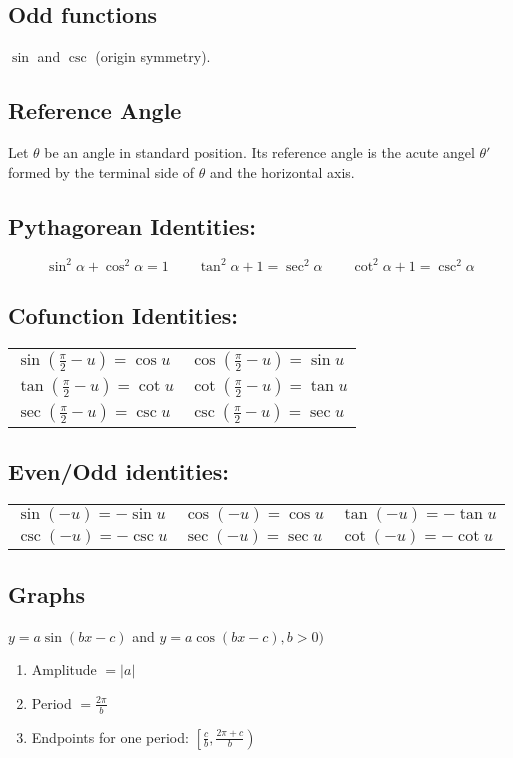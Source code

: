 \documentclass{amsart}
\begin{document}
\begin{multicols}{2}
    \subsection*{Odd functions} $\sin$ and $\csc$ (origin symmetry).
    \subsection*{Reference Angle}
     Let $\theta$ be an angle in standard position. Its reference angle is the acute angel $\theta '$ formed by the terminal side of
    $\theta$ and the horizontal axis.
    \subsection*{Pythagorean Identities:}
    \[\sin^2\alpha + \cos^2\alpha = 1\qquad\tan^2\alpha +1 = \sec^2\alpha\qquad\cot^2\alpha +1 = \csc^2\alpha\]
    \subsection*{Cofunction Identities:}
    \begin{center}
    \begin{tabular}[c]{ll}
       $\sin\left(\frac{\pi}{2}-u\right)=\cos u$ & $\cos\left(\frac{\pi}{2}-u\right)=\sin u$ \\
       $\tan\left(\frac{\pi}{2}-u\right)=\cot u$ & $\cot\left(\frac{\pi}{2}-u\right)=\tan u$ \\
       $\sec\left(\frac{\pi}{2}-u\right)=\csc u$ & $\csc\left(\frac{\pi}{2}-u\right)=\sec u$
    \end{tabular}
    \end{center}
    \subsection*{Even/Odd identities:}
    \begin{center}
    \begin{tabular}[c]{lll}
        $\sin(-u)=-\sin u$ & $\cos(-u)=\cos u$ & $\tan(-u)=-\tan u$\\
        $\csc(-u)=-\csc u$ & $\sec(-u)=\sec u$ & $\cot(-u)=-\cot u$
    \end{tabular}
    \end{center}
    \subsection*{Graphs}$y=a\sin(bx-c)$ and $y=a\cos(bx-c), b>0)$
    \begin{enumerate}
        \item Amplitude $=|a|$
        \item Period $=\frac{2\pi}{b}$
        \item Endpoints for one period: $\left[\frac{c}{b},\frac{2\pi +c}{b}\right)$
    \end{enumerate}

\end{multicols}
\end{document}
